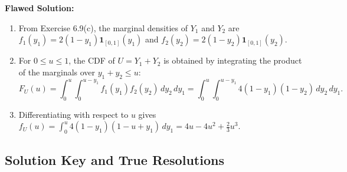 \documentclass[11pt, letterpaper]{article}
\theoremstyle{definition}
\theoremstyle{remark}
\begin{document}
\textbf{Flawed Solution:}
\begin{enumerate}[label=Step \arabic*:]
    \item From Exercise 6.9(c), the marginal densities of $Y_1$ and $Y_2$ are $f_1(y_1) = 2(1 - y_1)\mathbf{1}_{[0,1]}(y_1)$ and $f_2(y_2) = 2(1 - y_2)\mathbf{1}_{[0,1]}(y_2)$.
    \item For $0 \le u \le 1$, the CDF of $U = Y_1 + Y_2$ is obtained by integrating the product of the marginals over $y_1 + y_2 \le u$:
    \[
        F_U(u) = \int_{0}^{u} \int_{0}^{u - y_1} f_1(y_1)f_2(y_2)\,dy_2\,dy_1 = \int_{0}^{u} \int_{0}^{u - y_1} 4(1 - y_1)(1 - y_2)\,dy_2\,dy_1.
    \]
    \item Differentiating with respect to $u$ gives $f_U(u) = \int_0^u 4(1 - y_1)(1 - u + y_1)\,dy_1 = 4u - 4u^2 + \frac{2}{3}u^3$.
\end{enumerate}

\newpage
\subsection{Solution Key and True Resolutions}
\end{document}
